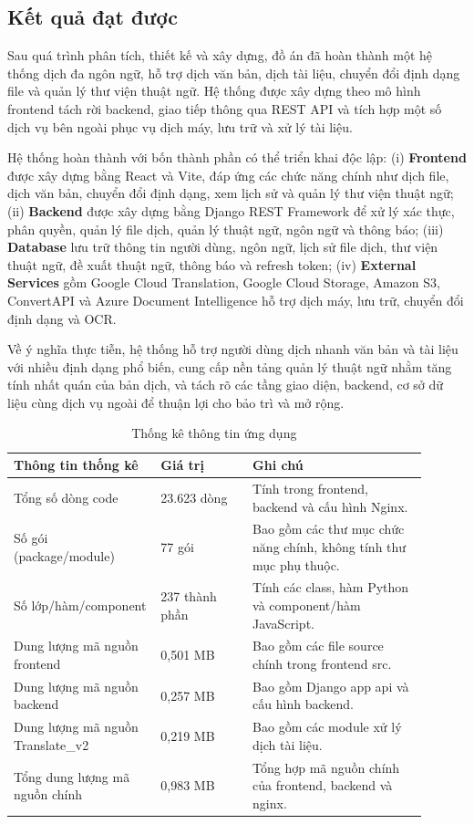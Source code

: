 ﻿\documentclass[../DoAn.tex]{subfiles}
\begin{document}
\subsection{Kết quả đạt được}
Sau quá trình phân tích, thiết kế và xây dựng, đồ án đã hoàn thành một hệ thống dịch đa ngôn ngữ, hỗ trợ dịch văn bản, dịch tài liệu, chuyển đổi định dạng file và quản lý thư viện thuật ngữ. Hệ thống được xây dựng theo mô hình frontend tách rời backend, giao tiếp thông qua REST API và tích hợp một số dịch vụ bên ngoài phục vụ dịch máy, lưu trữ và xử lý tài liệu.

Hệ thống hoàn thành với bốn thành phần có thể triển khai độc lập: (i) \textbf{Frontend} được xây dựng bằng React và Vite, đáp ứng các chức năng chính như dịch file, dịch văn bản, chuyển đổi định dạng, xem lịch sử và quản lý thư viện thuật ngữ; (ii) \textbf{Backend} được xây dựng bằng Django REST Framework để xử lý xác thực, phân quyền, quản lý file dịch, quản lý thuật ngữ, ngôn ngữ và thông báo; (iii) \textbf{Database} lưu trữ thông tin người dùng, ngôn ngữ, lịch sử file dịch, thư viện thuật ngữ, đề xuất thuật ngữ, thông báo và refresh token; (iv) \textbf{External Services} gồm Google Cloud Translation, Google Cloud Storage, Amazon S3, ConvertAPI và Azure Document Intelligence hỗ trợ dịch máy, lưu trữ, chuyển đổi định dạng và OCR.

Về ý nghĩa thực tiễn, hệ thống hỗ trợ người dùng dịch nhanh văn bản và tài liệu với nhiều định dạng phổ biến, cung cấp nền tảng quản lý thuật ngữ nhằm tăng tính nhất quán của bản dịch, và tách rõ các tầng giao diện, backend, cơ sở dữ liệu cùng dịch vụ ngoài để thuận lợi cho bảo trì và mở rộng.

\begin{table}[htbp]
\centering
\caption{Thống kê thông tin ứng dụng}
\label{table:application-statistics}
\small
\setlength{\tabcolsep}{4pt}
\renewcommand{\arraystretch}{1.18}
\begin{tabular}{|p{0.32\linewidth}|p{0.20\linewidth}|p{0.38\linewidth}|}
\hline
\textbf{Thông tin thống kê} & \textbf{Giá trị} & \textbf{Ghi chú} \\ \hline
Tổng số dòng code & 23.623 dòng & Tính trong frontend, backend và cấu hình Nginx. \\ \hline
Số gói (package/module) & 77 gói & Bao gồm các thư mục chức năng chính, không tính thư mục phụ thuộc. \\ \hline
Số lớp/hàm/component & 237 thành phần & Tính các class, hàm Python và component/hàm JavaScript. \\ \hline
Dung lượng mã nguồn frontend & 0,501 MB & Bao gồm các file source chính trong frontend src. \\ \hline
Dung lượng mã nguồn backend & 0,257 MB & Bao gồm Django app api và cấu hình backend. \\ \hline
Dung lượng mã nguồn Translate\_v2 & 0,219 MB & Bao gồm các module xử lý dịch tài liệu. \\ \hline
Tổng dung lượng mã nguồn chính & 0,983 MB & Tổng hợp mã nguồn chính của frontend, backend và nginx. \\ \hline
\end{tabular}
\end{table}
\end{document}
